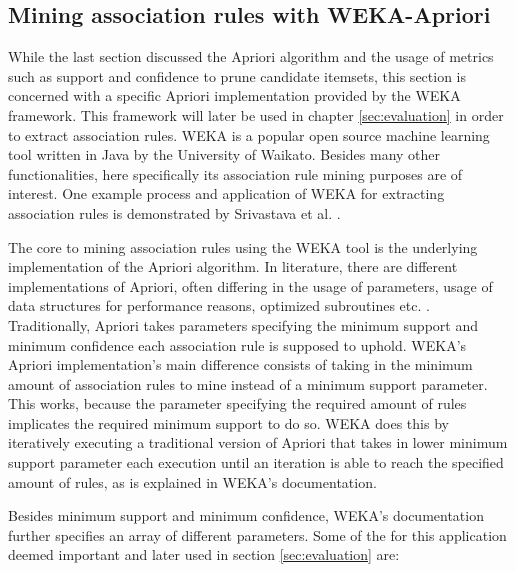 \documentclass[bachelor,english]{info1thesis}
\begin{document}




\subsection{Mining association rules with WEKA-Apriori}
\label{sec:wekaapriori}

While the last section discussed the Apriori algorithm and the usage of metrics such as support and confidence to prune candidate itemsets, this section is concerned with a specific Apriori implementation provided by the WEKA framework. This framework will later be used in chapter \ref{sec:evaluation} in order to extract association rules.
WEKA \cite{hall2009weka} is a popular open source machine learning tool written in Java by the University of Waikato. Besides many other functionalities, here specifically its association rule mining purposes are of interest. One example process and application of WEKA for extracting association rules is demonstrated by Srivastava et al. \cite{srivastava2014weka}.

The core to mining association rules using the WEKA tool is the underlying implementation of the Apriori algorithm. In literature, there are different implementations of Apriori, often differing in the usage of parameters, usage of data structures for performance reasons, optimized subroutines etc. . Traditionally, Apriori takes parameters specifying the minimum support and minimum confidence each association rule is supposed to uphold. WEKA's Apriori implementation's main difference consists of taking in the minimum amount of association rules to mine instead of a minimum support parameter. This works, because the parameter specifying the required amount of rules implicates the required minimum support to do so. WEKA does this by iteratively executing a traditional version of Apriori that takes in lower minimum support parameter each execution until an iteration is able to reach the specified amount of rules, as is explained in WEKA's documentation.

Besides minimum support and minimum confidence, WEKA's documentation \cite{agrawal1994fast} further specifies an array of different parameters. Some of the for this application deemed important and later used in section \ref{sec:evaluation} are:

\vspace{0.4cm}
\end{document}

